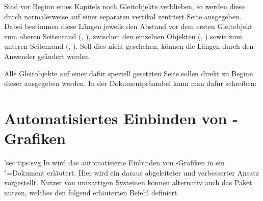 \begin{Declaration}{}
\begin{Declaration}{}
\begin{Declaration}{}
\begin{Declaration}{}
\begin{Declaration}{}
\begin{Declaration}{}
\printdeclarationlist*%
%
Sind vor Beginn eines Kapitels noch Gleitobjekte verblieben, so werden diese 
durch  normalerweise auf einer separaten vertikal zentriert Seite 
ausgegeben. Dabei bestimmen diese Längen jeweils den Abstand vor dem ersten 
Gleitobjekt zum oberen Seitenrand (, ), 
zwischen den einzelnen Objekten (, ) sowie 
zum unteren Seitenrand (, ). Soll dies nicht 
geschehen, können die Längen durch den Anwender geändert werden.
\end{Declaration}
\end{Declaration}
\end{Declaration}
\end{Declaration}
\end{Declaration}
\end{Declaration}
%
\begin{Example}
Alle Gleitobjekte auf einer dafür speziell gesetzten Seite sollen direkt zu 
Beginn dieser ausgegeben werden. In der Dokumentpräambel kann man dafür 
schreiben:
\begin{Code}
\makeatletter
\setlength{\@fptop}{0pt}
\setlength{\@dblfptop}{0pt} %
\makeatother
\end{Code}
\end{Example}



\section{Automatisiertes Einbinden von -Grafiken }
\manualhyperdef'{sec:tips:svg}%
%
%
In  wird das 
automatisierte Einbinden von -Grafiken in ein 
"=Dokument erläutert. Hier wird ein daraus abgeleiteter und 
verbesserter Ansatz vorgestellt. Nutzer von unixartigen Systemen können 
alternativ auch das Paket  nutzen, welches den folgend erläuterten 
Befehl  definiert.

